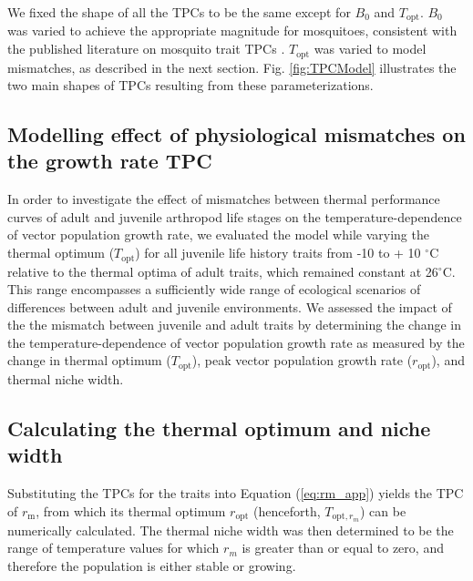 We fixed the shape of all the TPCs to be the same except for $B_0$ and $T_\text{opt}$. $B_0$ was varied to achieve the appropriate magnitude for mosquitoes, consistent with the published literature on mosquito trait TPCs \citep{Mordecai2012, Johnson2015}.  $T_\text{opt}$ was varied to model mismatches, as described in the next section. Fig. \ref{fig:TPCModel} illustrates the two main shapes of TPCs resulting from these parameterizations. 

\subsection*{Modelling effect of physiological mismatches on the growth rate TPC}

In order to investigate the effect of mismatches between thermal performance curves of adult and juvenile arthropod life stages on the temperature-dependence of vector population growth rate, we evaluated the model while varying the thermal optimum ($T_\text{opt}$) for all juvenile life history traits from -10 to + 10 $^\circ$C relative to the thermal optima of adult traits, which remained constant at 26$^\circ$C. This range encompasses a sufficiently wide range of ecological scenarios of differences between adult and juvenile environments. We assessed the impact of the the mismatch between juvenile and adult traits by determining the change in the temperature-dependence of vector population growth rate as measured by the change in thermal optimum ($T_\text{opt}$), peak vector population growth rate ($r_\text{opt}$), and thermal niche width.

\subsection*{Calculating the thermal optimum and niche width}

Substituting the TPCs for the traits into Equation (\ref{eq:rm_app}) yields the TPC of $r_\text{m}$, from which its thermal optimum $r_\text{opt}$ (henceforth, $T_{\text{opt},r_m}$) can be numerically calculated. The thermal niche width was then determined to be the range of temperature values for which $r_m$ is greater than or equal to zero, and therefore the population is either stable or growing.

